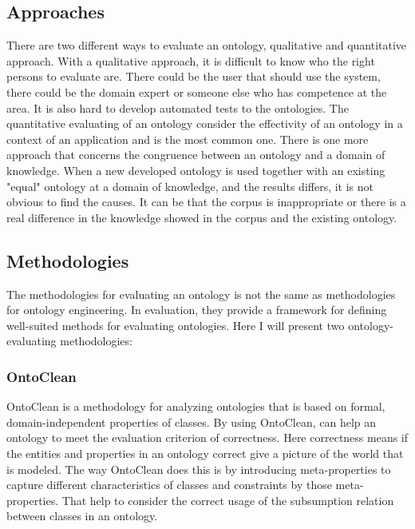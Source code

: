 
\subsection{Approaches}
There are two different ways to evaluate an ontology, qualitative and quantitative approach. With a qualitative approach, it is difficult to know who the right persons to evaluate are. There could be the user that should use the system, there could be the domain expert or someone else who has competence at the area. It is also hard to develop automated tests to the ontologies. The quantitative evaluating of an ontology consider the effectivity of an ontology in a context of an application and is the most common one. There is one more approach that concerns the congruence between an ontology and a domain of knowledge. When a new developed ontology is used together with an existing "equal" ontology at a domain of knowledge, and the results differs, it is not obvious to find the causes. It can be that the corpus is inappropriate or there is a real difference in the knowledge showed in the corpus and the existing ontology.\cite{brewster}

\subsection{Methodologies}
The methodologies for evaluating an ontology is not the same as methodologies for ontology engineering. In evaluation, they provide a framework for defining well-suited methods for evaluating ontologies. Here I will present two ontology-evaluating methodologies: \cite{yu}

\subsubsection{OntoClean}
OntoClean is a methodology for analyzing ontologies that is based on formal, domain-independent properties of classes. By using OntoClean, can help an ontology to meet the evaluation criterion of correctness. Here correctness means if the entities and properties in an ontology correct give a picture of the world that is modeled. The way OntoClean does this is by introducing meta-properties  to capture different characteristics of classes and constraints by those meta-properties. That help to consider the correct usage of the subsumption relation between classes in an ontology.

